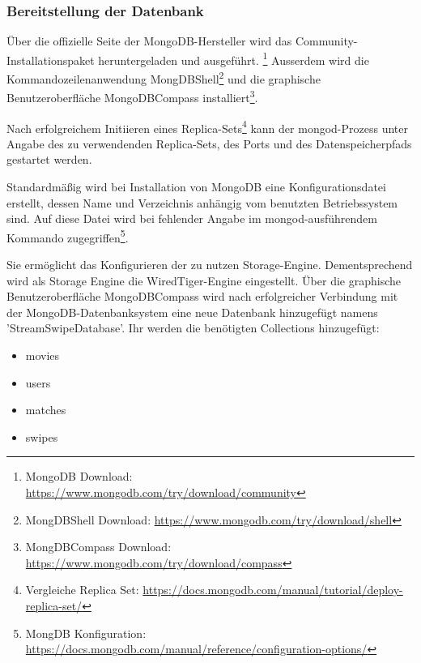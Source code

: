 \subsubsection{Bereitstellung der Datenbank}
Über die offizielle Seite der MongoDB-Hersteller wird das Community-Installationspaket heruntergeladen und ausgeführt. \footnote{MongoDB Download: \url{ https://www.mongodb.com/try/download/community}}
Ausserdem wird die Kommandozeilenanwendung MongDBShell\footnote{MongDBShell Download: \url{ https://www.mongodb.com/try/download/shell}} und die
graphische Benutzeroberfläche MongoDBCompass installiert\footnote{MongDBCompass  Download: \url{https://www.mongodb.com/try/download/compass}}. 

Nach erfolgreichem Initiieren eines Replica-Sets\footnote{Vergleiche Replica Set: \url{https://docs.mongodb.com/manual/tutorial/deploy-replica-set/}}
kann der mongod-Prozess unter Angabe des zu verwendenden Replica-Sets, des Ports und des Datenspeicherpfads gestartet werden. \newline


\noindent
Standardmäßig wird bei Installation von MongoDB eine Konfigurationsdatei erstellt, dessen Name und Verzeichnis anhängig vom benutzten Betriebssystem sind. Auf diese Datei wird bei fehlender Angabe im mongod-ausführendem Kommando zugegriffen\footnote{MongDB Konfiguration: \url{https://docs.mongodb.com/manual/reference/configuration-options/}}.

Sie ermöglicht das Konfigurieren der zu nutzen Storage-Engine. Dementsprechend wird als Storage Engine die WiredTiger-Engine eingestellt. 
Über die graphische Benutzeroberfläche MongoDBCompass wird nach erfolgreicher Verbindung mit der MongoDB-Datenbanksystem eine neue Datenbank hinzugefügt namens 'StreamSwipeDatabase'. Ihr werden die benötigten Collections hinzugefügt:

\begin{itemize}
\item movies
\item users
\item matches
\item swipes
\end{itemize}

